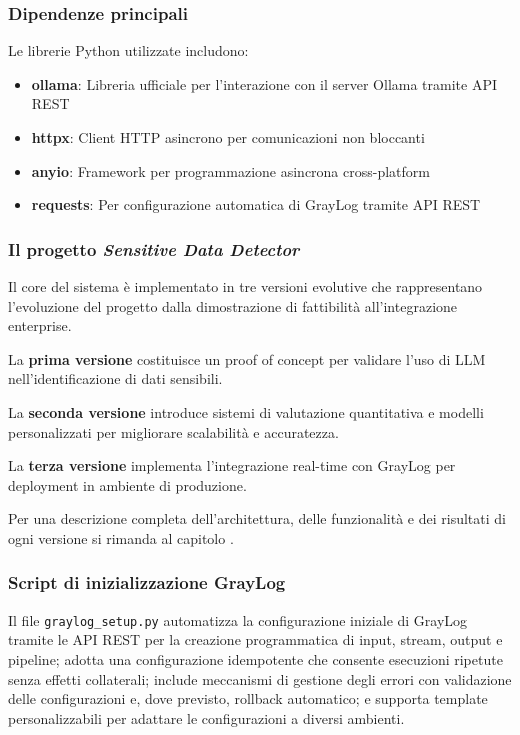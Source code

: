 \documentclass[12pt]{report}
\begin{document}
\subsubsection{Dipendenze principali}
Le librerie Python utilizzate includono:

\begin{itemize}
    \item \textbf{ollama}: Libreria ufficiale per l'interazione con il server Ollama tramite API REST
    \item \textbf{httpx}: Client HTTP asincrono per comunicazioni non bloccanti
    \item \textbf{anyio}: Framework per programmazione asincrona cross-platform
    \item \textbf{requests}: Per configurazione automatica di GrayLog tramite API REST
\end{itemize}

\subsubsection{Il progetto \textit{Sensitive Data Detector}}
Il core del sistema è implementato in tre versioni evolutive che rappresentano l'evoluzione del progetto dalla dimostrazione di fattibilità all'integrazione enterprise.

La \textbf{prima versione} costituisce un proof of concept per validare l'uso di LLM nell'identificazione di dati sensibili.

La \textbf{seconda versione} introduce sistemi di valutazione quantitativa e modelli personalizzati per migliorare scalabilità e accuratezza.

La \textbf{terza versione} implementa l'integrazione real-time con GrayLog per deployment in ambiente di produzione.

Per una descrizione completa dell'architettura, delle funzionalità e dei risultati di ogni versione si rimanda al capitolo .

\subsubsection{Script di inizializzazione GrayLog}
Il file \texttt{graylog\_setup.py} automatizza la configurazione iniziale di GrayLog tramite le API REST per la creazione programmatica di input, stream, output e pipeline; adotta una configurazione idempotente che consente esecuzioni ripetute senza effetti collaterali; include meccanismi di gestione degli errori con validazione delle configurazioni e, dove previsto, rollback automatico; e supporta template personalizzabili per adattare le configurazioni a diversi ambienti.
\end{document}
